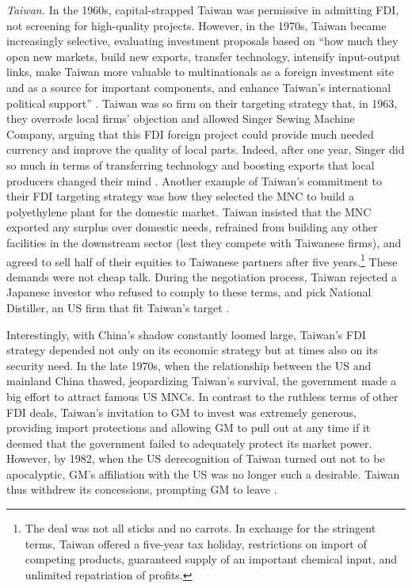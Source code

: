 \textit{Taiwan.} In the 1960s, capital-strapped Taiwan was permissive in
admitting FDI, not screening for high-quality projects. However, in the 1970s,
Taiwan became increasingly selective, evaluating investment proposals based on
``how much they open new markets, build new exports, transfer technology,
intensify input-output links, make Taiwan more valuable to multinationals as a
foreign investment site and as a source for important components, and enhance
Taiwan's international political support'' \citep[151]{Wade2003}. Taiwan was so
firm on their targeting strategy that, in 1963, they overrode local firms'
objection and allowed Singer Sewing Machine Company, arguing that this FDI
foreign project could provide much needed currency and improve the quality of
local parts. Indeed, after one year, Singer did so much in terms of transferring
technology and boosting exports that local producers changed their mind
\citep{Ranis1985}. Another example of Taiwan's commitment to their FDI targeting
strategy was how they selected the MNC to build a polyethylene plant for the
domestic market. Taiwan insisted that the MNC exported any surplus over domestic
needs, refrained from building any other facilities in the downstream sector
(lest they compete with Taiwanese firms), and agreed to sell half of their
equities to Taiwanese partners after five years.\footnote{The deal was not all
  sticks and no carrots. In exchange for the stringent terms, Taiwan offered a
  five-year tax holiday, restrictions on import of competing products,
  guaranteed supply of an important chemical input, and unlimited repatriation
  of profits.} These demands were not cheap talk. During the negotiation
process, Taiwan rejected a Japanese investor who refused to comply to these
terms, and pick National Distiller, an US firm that fit Taiwan's target
\citep[151]{Wade2003}.

Interestingly, with China's shadow constantly loomed large, Taiwan's FDI
strategy depended not only on its economic strategy but at times also on its
security need. In the late 1970s, when the relationship between the US and
mainland China thawed, jeopardizing Taiwan's survival, the government made a big
effort to attract famous US MNCs. In contrast to the ruthless terms of other FDI
deals, Taiwan's invitation to GM to invest was extremely generous, providing
import protections and allowing GM to pull out at any time if it deemed that the
government failed to adequately protect its market power. However, by 1982, when
the US derecognition of Taiwan turned out not to be apocalyptic, GM's
affiliation with the US was no longer such a desirable. Taiwan thus
withdrew its concessions, prompting GM to leave \citep{Noble1987}.

